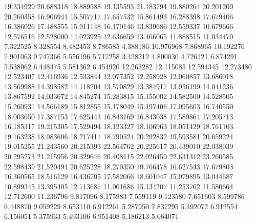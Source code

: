 19.334929
20.688318
18.889588
19.135593
21.183794
19.880264
20.201209
20.260358
16.906941
15.507717
17.657532
15.861493
16.288398
17.679406
16.386026
17.488555
15.911148
16.170146
13.839686
12.559337
10.679666
12.576516
12.528000
14.023925
12.636659
13.466065
11.888515
11.034470
7.322525
8.328554
8.482453
8.786585
4.388186
10.976968
7.868965
10.192276
7.901063
9.747366
5.556196
5.717258
3.428212
4.800030
4.726121
6.874291
5.538062
6.448475
5.581362
6.454920
12.263282
12.115085
12.594345
12.273480
12.523407
12.416936
12.533844
12.077352
12.258928
12.060857
13.686018
13.569988
14.398582
14.118204
13.570829
13.384917
13.956199
14.041236
13.867592
14.033672
14.845274
15.283815
15.155002
14.582500
14.528505
15.260931
14.566189
15.812855
15.178049
15.197406
17.095603
16.740550
18.003650
17.387153
17.625443
16.843169
16.843038
17.589864
17.205713
16.185317
19.215305
17.529494
18.123327
18.106963
18.051429
18.761103
19.163238
18.983606
18.217411
18.790524
20.292832
19.593581
20.659224
19.015255
21.243560
20.215393
22.564762
20.225617
20.439010
22.038039
20.295273
21.215956
20.329646
20.408115
22.026459
22.631312
23.260585
22.598439
21.520494
20.625228
18.270350
19.766478
16.627543
17.679803
16.360565
18.516129
16.436705
17.582066
18.601047
15.979895
13.044687
10.899345
13.395405
12.713687
11.001686
15.134207
11.253762
11.580664
12.712600
11.236796
9.817096
8.175983
7.559119
9.123580
7.651603
8.599786
6.448870
9.059229
8.653110
6.912261
5.287950
7.837295
5.492072
6.912554
6.156051
5.375933
5.493106
6.951408
5.186213
5.064071
